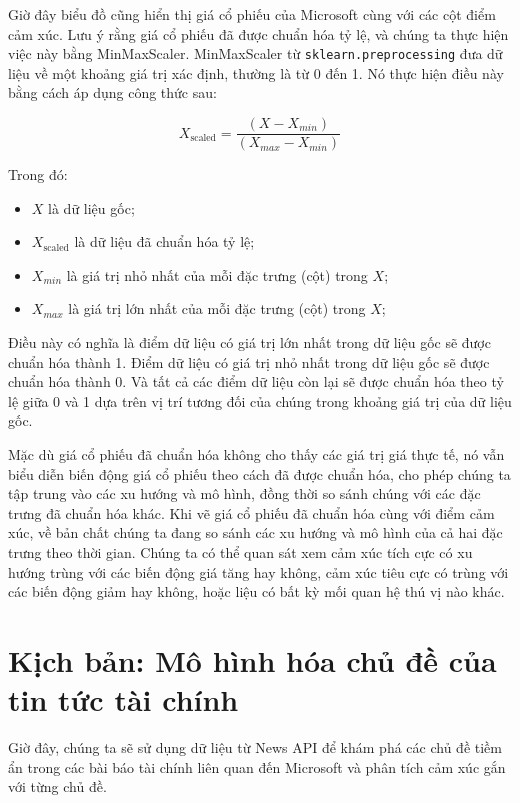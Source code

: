 Giờ đây biểu đồ cũng hiển thị giá cổ phiếu của Microsoft cùng với các cột điểm cảm xúc. Lưu ý rằng giá cổ phiếu đã được chuẩn hóa tỷ lệ, và chúng ta thực hiện việc này bằng MinMaxScaler. MinMaxScaler từ \texttt{sklearn.preprocessing} đưa dữ liệu về một khoảng giá trị xác định, thường là từ 0 đến 1. Nó thực hiện điều này bằng cách áp dụng công thức sau:

\[X_{\text{scaled}} = \frac{(X - X_{min})}{(X_{max} - X_{min})}\]

Trong đó:

\begin{itemize}
\item
  \(X\) là dữ liệu gốc;
\item
  \(X_{\text{scaled}}\) là dữ liệu đã chuẩn hóa tỷ lệ;
\item
  \(X_{min}\) là giá trị nhỏ nhất của mỗi đặc trưng (cột) trong \(X\);
\item
  \(X_{max}\) là giá trị lớn nhất của mỗi đặc trưng (cột) trong \(X\);
\end{itemize}

Điều này có nghĩa là điểm dữ liệu có giá trị lớn nhất trong dữ liệu gốc sẽ được chuẩn hóa thành 1. Điểm dữ liệu có giá trị nhỏ nhất trong dữ liệu gốc sẽ được chuẩn hóa thành 0. Và tất cả các điểm dữ liệu còn lại sẽ được chuẩn hóa theo tỷ lệ giữa 0 và 1 dựa trên vị trí tương đối của chúng trong khoảng giá trị của dữ liệu gốc.

Mặc dù giá cổ phiếu đã chuẩn hóa không cho thấy các giá trị giá thực tế, nó vẫn biểu diễn biến động giá cổ phiếu theo cách đã được chuẩn hóa, cho phép chúng ta tập trung vào các xu hướng và mô hình, đồng thời so sánh chúng với các đặc trưng đã chuẩn hóa khác. Khi vẽ giá cổ phiếu đã chuẩn hóa cùng với điểm cảm xúc, về bản chất chúng ta đang so sánh các xu hướng và mô hình của cả hai đặc trưng theo thời gian. Chúng ta có thể quan sát xem cảm xúc tích cực có xu hướng trùng với các biến động giá tăng hay không, cảm xúc tiêu cực có trùng với các biến động giảm hay không, hoặc liệu có bất kỳ mối quan hệ thú vị nào khác.

\section{Kịch bản: Mô hình hóa chủ đề của tin tức tài chính}

Giờ đây, chúng ta sẽ sử dụng dữ liệu từ News API để khám phá các chủ đề tiềm ẩn trong các bài báo tài chính liên quan đến Microsoft và phân tích cảm xúc gắn với từng chủ đề.


